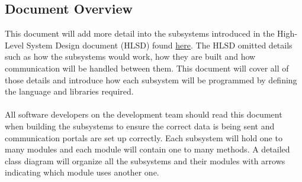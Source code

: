 \documentclass[11pt]{article}
\begin{document}
\subsection{Document Overview}
This document will add more detail into the subsystems introduced in the High-Level System Design document (HLSD) found \href{run:../Design.pdf}{here}. The HLSD omitted details such as how the subsystems would work, how they are built and how communication will be handled between them. This document will cover all of those details and introduce how each subsystem will be programmed by defining the language and libraries required. \\ \\
All software developers on the development team should read this document when building the subsystems to ensure the correct data is being sent and communication portals are set up correctly. Each subsystem will hold one to many modules and each module will contain one to many methods. A detailed class diagram will organize all the subsystems and their modules with arrows indicating which module uses another one.
\end{document}
